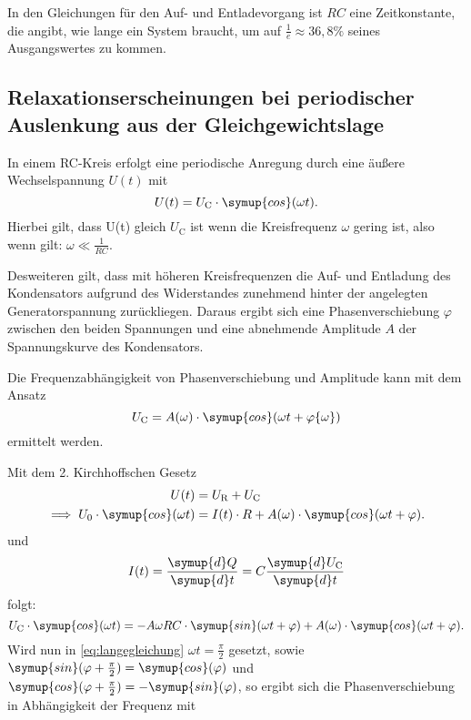 In den Gleichungen für den Auf- und Entladevorgang ist $RC$ eine Zeitkonstante, die angibt, wie lange ein System braucht, 
um auf $\frac{1}{e} \approx 36{,}8\%$ seines Ausgangswertes zu kommen.



\subsection{Relaxationserscheinungen bei periodischer Auslenkung aus der Gleichgewichtslage}

In einem RC-Kreis erfolgt eine periodische Anregung durch eine äußere Wechselspannung $U(t)$ mit
\begin{equation*}
U(t) = U_{\text{C}}\cdot \symup{cos}(\omega t).
\end{equation*}
Hierbei gilt, dass U(t) gleich $U_{\text{C}}$ ist wenn die Kreisfrequenz $\omega$ gering ist, also wenn gilt: $\omega \ll \frac{1}{RC}$.

Desweiteren gilt, dass mit höheren Kreisfrequenzen die Auf- und Entladung des Kondensators aufgrund des Widerstandes zunehmend hinter der 
angelegten Generatorspannung zurückliegen. Daraus ergibt sich eine Phasenverschiebung 
$\varphi$ zwischen den beiden Spannungen und eine abnehmende Amplitude $A$ der Spannungskurve des Kondensators.

Die Frequenzabhängigkeit von Phasenverschiebung und Amplitude kann mit dem Ansatz
\begin{equation*}
U_{\text{C}} = A(\omega)\cdot \symup{cos}(\omega t + \varphi \{\omega\})
\end{equation*}
ermittelt werden. 

Mit dem 2. Kirchhoffschen Gesetz
\begin{equation*}
\begin{aligned}
U(t) &= U_{\text{R}} + U_{\text{C}} \\
\implies U_0 \cdot \symup{cos}(\omega t) &= I(t)\cdot R + A(\omega)\cdot \symup{cos}(\omega t + \varphi).
\end{aligned}
\end{equation*}
und 
\begin{equation}
I(t) = \frac{\symup{d}Q}{\symup{d}t} = C \frac{\symup{d}U_{\text{C}}}{\symup{d}t}
\label{eq:strom2}
\end{equation}
folgt:
\begin{equation}
U_{\text{C}}\cdot \symup{cos}(\omega t) = -A\omega RC\cdot \symup{sin}(\omega t + \varphi) + A(\omega)\cdot \symup{cos}(\omega t + \varphi).
\label{eq:langegleichung}
\end{equation}
Wird nun in \eqref{eq:langegleichung} $\omega t = \frac{\pi}{2}$ gesetzt, sowie 
$\symup{sin}(\varphi + \frac{\pi}{2}) = \symup{cos}(\varphi)$ und $\symup{cos}(\varphi + \frac{\pi}{2}) = -\symup{sin}(\varphi)$,
so ergibt sich die Phasenverschiebung in Abhängigkeit der Frequenz mit

